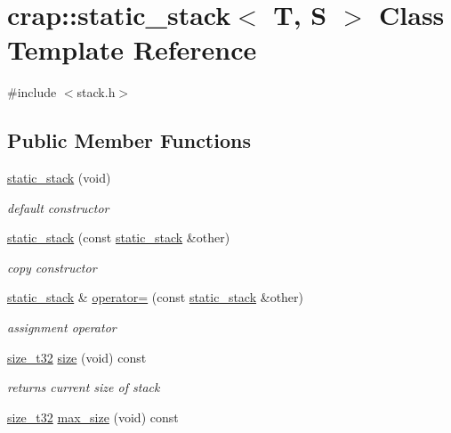\hypertarget{classcrap_1_1static__stack}{\section{crap\-:\-:static\-\_\-stack$<$ T, S $>$ Class Template Reference}
\label{classcrap_1_1static__stack}
}


{\ttfamily \#include $<$stack.\-h$>$}

\subsection*{Public Member Functions}
\begin{DoxyCompactItemize}
\item 
\hyperlink{classcrap_1_1static__stack_a8d15d6a53bf2358c2a2ff52e8e8e8a31}{static\-\_\-stack} (void)
\begin{DoxyCompactList}\small\item\em default constructor \end{DoxyCompactList}\item 
\hyperlink{classcrap_1_1static__stack_ab037da1dd38ecb31f43e4f865827aa71}{static\-\_\-stack} (const \hyperlink{classcrap_1_1static__stack}{static\-\_\-stack} \&other)
\begin{DoxyCompactList}\small\item\em copy constructor \end{DoxyCompactList}\item 
\hyperlink{classcrap_1_1static__stack}{static\-\_\-stack} \& \hyperlink{classcrap_1_1static__stack_a9351919bcadd21872d8ab246ecf42a19}{operator=} (const \hyperlink{classcrap_1_1static__stack}{static\-\_\-stack} \&other)
\begin{DoxyCompactList}\small\item\em assignment operator \end{DoxyCompactList}\item 
\hyperlink{types_8h_a38c0a12279ffe0fabec44939e753c914}{size\-\_\-t32} \hyperlink{classcrap_1_1static__stack_a765910dc7827be3a8187ed4c1e9f4262}{size} (void) const 
\begin{DoxyCompactList}\small\item\em returns current size of stack \end{DoxyCompactList}\item 
\hyperlink{types_8h_a38c0a12279ffe0fabec44939e753c914}{size\-\_\-t32} \hyperlink{classcrap_1_1static__stack_ac2952d1a201c89a14c23df6f47a51303}{max\-\_\-size} (void) const 

\end{DoxyCompactItemize}
